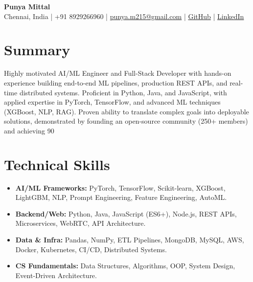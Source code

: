 \documentclass[10pt, letterpaper]{article}
\newcommand{\contactinfo}[1]{
    \centering
    \vspace{2pt}
    \textbf{\Huge Punya Mittal} \\
    \small #1
    \vspace{4pt}
}
\begin{document}
\contactinfo{
    Chennai, India | +91 8929266960 | \href{mailto:punya.m215@gmail.com}{punya.m215@gmail.com} | 
    \href{https://github.com/PunyaMittal}{GitHub} | \href{https://linkedin.com/in/punya-mittal-a1122520b}{LinkedIn}
}

\section*{Summary}
Highly motivated AI/ML Engineer and Full-Stack Developer with hands-on experience building end-to-end ML pipelines, production REST APIs, and real-time distributed systems. Proficient in Python, Java, and JavaScript, with applied expertise in PyTorch, TensorFlow, and advanced ML techniques (XGBoost, NLP, RAG). Proven ability to translate complex goals into deployable solutions, demonstrated by founding an open-source community (250+ members) and achieving 90%

\section*{Technical Skills}
\begin{itemize}[leftmargin=*, itemsep=0pt, parsep=0pt]
    \item \textbf{AI/ML Frameworks:} PyTorch, TensorFlow, Scikit-learn, XGBoost, LightGBM, NLP, Prompt Engineering, Feature Engineering, AutoML.
    \item \textbf{Backend/Web:} Python, Java, JavaScript (ES6+), Node.js, REST APIs, Microservices, WebRTC, API Architecture.
    \item \textbf{Data & Infra:} Pandas, NumPy, ETL Pipelines, MongoDB, MySQL, AWS, Docker, Kubernetes, CI/CD, Distributed Systems.
    \item \textbf{CS Fundamentals:} Data Structures, Algorithms, OOP, System Design, Event-Driven Architecture.
\end{itemize}

\end{document}

